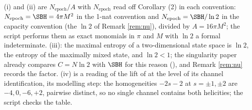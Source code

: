 (i) and (ii) are $N_{\mathrm{epoch}}/A$ with $N_{\mathrm{epoch}}$ read off Corollary (2) in each convention: $N_{\mathrm{epoch}} = \SBH = 4\pi M^2$ in the 1-nat convention and $N_{\mathrm{epoch}} = \SBH/\ln 2$ in the capacity convention (the $\ln 2$ of Remark \ref{rem:nu}), divided by $A = 16\pi M^2$; the script performs them as exact monomials in $\pi$ and $M$ with $\ln 2$ a formal indeterminate. (iii): the maximal entropy of a two-dimensional state space is $\ln 2$, the entropy of the maximally mixed state, and $\ln 2 < 1$; the singularity paper already compares $C = N\ln 2$ with $\SBH$ for this reason \cite[Prop.~10.7]{ButlerT5} (), and Remark \ref{rem:nu} records the factor. (iv) is a reading of the lift of  at the level of its channel identification, its modelling step: the homogeneities $-2s - 2$ at $s = \pm 1, \pm 2$ are $-4, 0, -6, +2$, pairwise distinct, so no single channel contains both helicities; the script checks the table.
